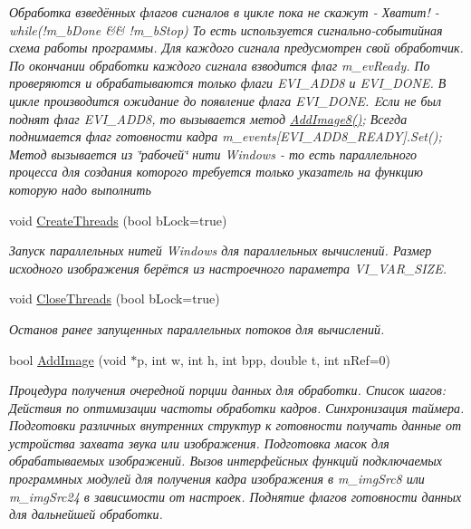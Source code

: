 \begin{DoxyCompactItemize}
\begin{DoxyCompactList}\small\item\em Обработка взведённых флагов сигналов в цикле пока не скажут -\/ Хватит! -\/ while(!m\+\_\+b\+Done \&\& !m\+\_\+b\+Stop) То есть используется сигнально-\/событийная схема работы программы. Для каждого сигнала предусмотрен свой обработчик. По окончании обработки каждого сигнала взводится флаг m\+\_\+ev\+Ready. По проверяются и обрабатываются только флаги E\+V\+I\+\_\+\+A\+D\+D8 и E\+V\+I\+\_\+\+D\+O\+N\+E. В цикле производится ожидание до появление флага E\+V\+I\+\_\+\+D\+O\+N\+E. Eсли не был поднят флаг E\+V\+I\+\_\+\+A\+D\+D8, то вызывается метод \hyperlink{class_c_v_i_engine_base_a3fe6ae4f9ac6b9422c22d99878f424f5}{Add\+Image8()}; Всегда поднимается флаг готовности кадра m\+\_\+events\mbox{[}E\+V\+I\+\_\+\+A\+D\+D8\+\_\+\+R\+E\+A\+D\+Y\mbox{]}.Set(); Метод вызывается из \char`\"{}рабочей\char`\"{} нити Windows -\/ то есть параллельного процесса для создания которого требуется только указатель на функцию которую надо выполнить \end{DoxyCompactList}\item 
void \hyperlink{class_c_v_i_engine_base_a053908c9c2c18583a13e6f6f79c8eeab}{Create\+Threads} (bool b\+Lock=true)
\begin{DoxyCompactList}\small\item\em Запуск параллельных нитей Windows для параллельных вычислений. Размер исходного изображения берётся из настроечного параметра V\+I\+\_\+\+V\+A\+R\+\_\+\+S\+I\+Z\+E. \end{DoxyCompactList}\item 
void \hyperlink{class_c_v_i_engine_base_a0905eba46bb64f25a2d91f8b39a3f994}{Close\+Threads} (bool b\+Lock=true)
\begin{DoxyCompactList}\small\item\em Останов ранее запущенных параллельных потоков для вычислений. \end{DoxyCompactList}\item 
bool \hyperlink{class_c_v_i_engine_base_ac886baeaf14b16970d089edaf6767a79}{Add\+Image} (void $\ast$p, int w, int h, int bpp, double t, int n\+Ref=0)
\begin{DoxyCompactList}\small\item\em Процедура получения очередной порции данных для обработки. Список шагов\+: Действия по оптимизации частоты обработки кадров. Синхронизация таймера. Подготовки различных внутренних структур к готовности получать данные от устройства захвата звука или изображения. Подготовка масок для обрабатываемых изображений. Вызов интерфейсных функций подключаемых программных модулей для получения кадра изображения в m\+\_\+img\+Src8 или m\+\_\+img\+Src24 в зависимости от настроек. Поднятие флагов готовности данных для дальнейшей обработки. \end{DoxyCompactList}\item 

\end{DoxyCompactItemize}
